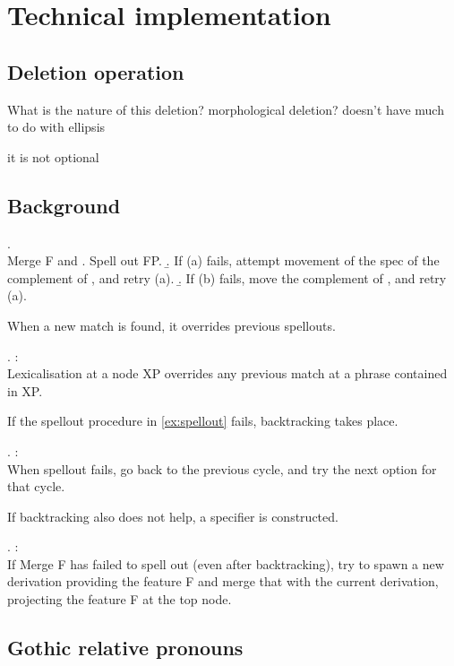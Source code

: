 
\chapter{Technical implementation}

\section{Deletion operation}

What is the nature of this deletion? morphological deletion? doesn't have much to do with ellipsis

it is not optional



\section{Background}



\ex. \\
Merge F and \label{ex:spellout}
 \a. Spell out FP.
 \b. If (a) fails, attempt movement of the spec of the complement of , and retry (a).
 \b. If (b) fails, move the complement of , and retry (a).

When a new match is found, it overrides previous spellouts.

\ex.  \citep{starke2018}:\\
Lexicalisation at a node XP overrides any previous match at a phrase contained in XP.

If the spellout procedure in \ref{ex:spellout} fails, backtracking takes place.

\ex.  \citep{starke2018}:\\
When spellout fails, go back to the previous cycle, and try the next option for that cycle.\label{ex:backtracking}

If backtracking also does not help, a specifier is constructed.

\ex.  \citep{starke2018}:\\
If Merge F has failed to spell out (even after backtracking), try to spawn a new derivation providing the feature F and merge that with the current derivation, projecting the feature F at the top node.\label{ex:specformation}

\phantom{hi}


\section{Gothic relative pronouns}

